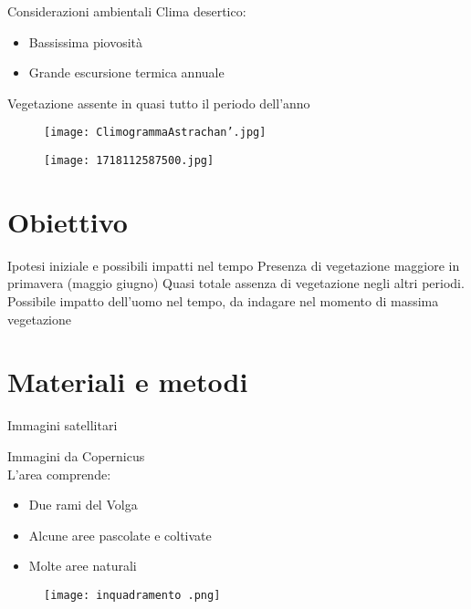 \documentclass{beamer} %
\begin{document}
\begin{frame}{Considerazioni ambientali} 
Clima desertico: 
	\begin{itemize}
        	\item Bassissima piovosità
        	\item Grande escursione termica annuale 
	\end{itemize}
Vegetazione assente in quasi tutto il periodo dell'anno 

\begin{multicols}{2}
	\begin{figure}
		\centering
		\texttt{[image: ClimogrammaAstrachan'.jpg]}
		\label{fig:enter-label}
	\end{figure}
\columnbreak
	\begin{figure}
		\centering
		\texttt{[image: 1718112587500.jpg]}
		\label{fig:enter-label}
	\end{figure}
\end{multicols}
\end{frame}


\section{Obiettivo}


\begin{frame}{Ipotesi iniziale e possibili impatti nel tempo}
Presenza di vegetazione maggiore in primavera (maggio giugno)
Quasi totale assenza di vegetazione negli altri periodi. \\
\bigskip 
Possibile impatto dell'uomo nel tempo, da indagare nel momento di massima vegetazione
\end{frame}


\section{Materiali e metodi}


\begin{frame}{Immagini satellitari}
\begin{multicols}{2}
Immagini da Copernicus\\
L'area comprende: 
	\begin{itemize}
		\item Due rami del Volga 
		\item Alcune aree pascolate e coltivate 
		\item Molte aree naturali
	\end{itemize}
\columnbreak
	\begin{figure}
		\centering
		\texttt{[image: inquadramento .png]}
  		\label{fig:enter-label}
	\end{figure}
\end{multicols}
\end{frame}
\end{document}
